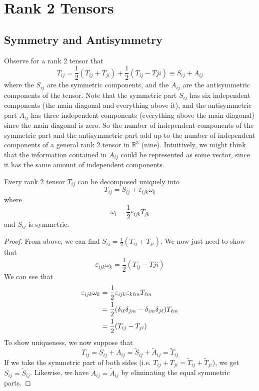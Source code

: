 \documentclass{article}
\begin{document}
\section{Rank 2 Tensors}
\subsection{Symmetry and Antisymmetry}
Observe for a rank 2 tensor that
\[ T_{ij} = \frac{1}{2}\left( T_{ij} + T_{ji} \right) + \frac{1}{2}\left( T_{ij} - T{ji} \right) \equiv S_{ij} + A_{ij} \]
where the $S_{ij}$ are the symmetric components, and the $A_{ij}$ are the antisymmetric components of the tensor. Note that the symmetric part $S_{ij}$ has six independent components (the main diagonal and everything above it), and the antisymmetric part $A_{ij}$ has three independent components (everything above the main diagonal) since the main diagonal is zero. So the number of independent components of the symmetric part and the antisymmetric part add up to the number of independent components of a general rank 2 tensor in $\mathbb R^3$ (nine). Intuitively, we might think that the information contained in $A_{ij}$ could be represented as some vector, since it has the same amount of independent components.
\begin{proposition}
	Every rank 2 tensor $T_{ij}$ can be decomposed uniquely into
	\[ T_{ij} = S_{ij} + \varepsilon_{ijk} \omega_k \]
	where
	\[ \omega_i = \frac{1}{2}\varepsilon_{ijk} T_{jk} \]
	and $S_{ij}$ is symmetric.
\end{proposition}
\begin{proof}
	From above, we can find $S_{ij} = \frac{1}{2}\left( T_{ij} + T_{ji} \right)$. We now just need to show that
	\[ \varepsilon_{ijk} \omega_k = \frac{1}{2}\left( T_{ij} - T{ji} \right) \]
	We can see that
	\begin{align*}
		\varepsilon_{ijk} \omega_k &= \frac{1}{2}\varepsilon_{ijk} \varepsilon_{k\ell m} T_{\ell m} \\
		&= \frac{1}{2}\qty(\delta_{i\ell} \delta_{jm} - \delta_{im}\delta_{j\ell}) T_{\ell m} \\
		&= \frac{1}{2}\qty(T_{ij} - T_{ji})
	\end{align*}
	To show uniqueness, we now suppose that
	\[ T_{ij} = S_{ij} + A_{ij} = \widetilde{S}_{ij} + \widetilde{A}_{ij} = \widetilde{T}_{ij} \]
	If we take the symmetric part of both sides (i.e. $T_{ij} + T_{ji} = \widetilde{T}_{ij} + \widetilde{T}_{ji}$), we get $S_{ij} = \widetilde{S}_{ij}$. Likewise, we have $A_{ij} = \widetilde{A}_{ij}$ by eliminating the equal symmetric parts.
\end{proof}
\end{document}
